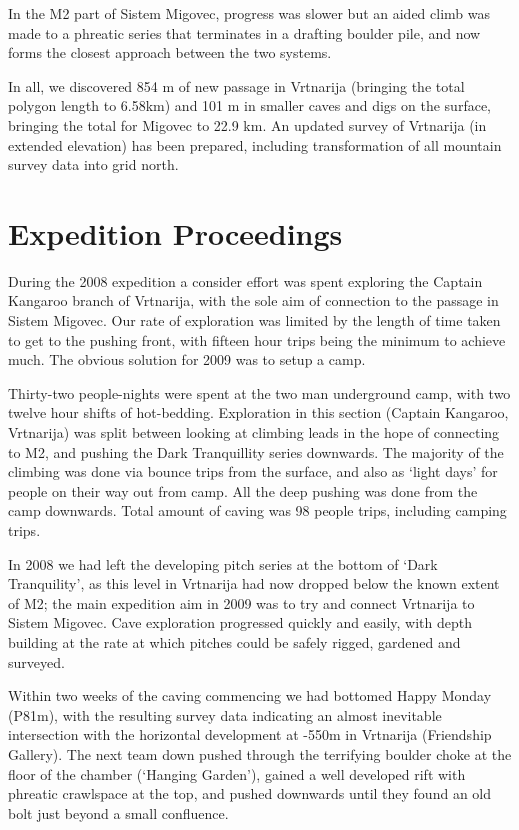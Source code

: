 In the M2 part of Sistem Migovec, progress was slower but an aided climb
was made to a phreatic series that terminates in a drafting boulder
pile, and now forms the closest approach between the two systems.

In all, we discovered 854 m of new passage in Vrtnarija (bringing the
total polygon length to 6.58km) and 101 m in smaller caves and digs on
the surface, bringing the total for Migovec to 22.9 km. An updated
survey of Vrtnarija (in extended elevation) has been prepared, including
transformation of all mountain survey data into grid north.

\section{Expedition Proceedings}\label{expedition-proceedings}

During the 2008 expedition a consider effort was spent exploring the
Captain Kangaroo branch of Vrtnarija, with the sole aim of connection to
the passage in Sistem Migovec. Our rate of exploration was limited by
the length of time taken to get to the pushing front, with fifteen hour
trips being the minimum to achieve much. The obvious solution for 2009
was to setup a camp.

Thirty-two people-nights were spent at the two man underground camp,
with two twelve hour shifts of hot-bedding. Exploration in this section
(Captain Kangaroo, Vrtnarija) was split between looking at climbing
leads in the hope of connecting to M2, and pushing the Dark Tranquillity
series downwards. The majority of the climbing was done via bounce trips
from the surface, and also as `light days' for people on their way out
from camp. All the deep pushing was done from the camp downwards. Total
amount of caving was 98 people trips, including camping trips.

In 2008 we had left the developing pitch series at the bottom of `Dark
Tranquility', as this level in Vrtnarija had now dropped below the known
extent of M2; the main expedition aim in 2009 was to try and connect
Vrtnarija to Sistem Migovec. Cave exploration progressed quickly and
easily, with depth building at the rate at which pitches could be safely
rigged, gardened and surveyed.

Within two weeks of the caving commencing we had bottomed Happy Monday
(P81m), with the resulting survey data indicating an almost inevitable
intersection with the horizontal development at -550m in Vrtnarija
(Friendship Gallery). The next team down pushed through the terrifying
boulder choke at the floor of the chamber (`Hanging Garden'), gained a
well developed rift with phreatic crawlspace at the top, and pushed
downwards until they found an old bolt just beyond a small confluence.

